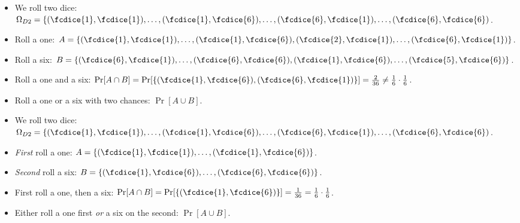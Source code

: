 \documentclass{beamer}
\begin{document}
\begin{frame}
  \begin{example}
    \begin{itemize}
      \item We roll two dice: \(\Omega_{D2} = \{(\fcdice{1},\fcdice{1}), 
          \ldots, (\fcdice{1}, \fcdice{6}), \ldots, (\fcdice{6}, \fcdice{1}), 
          \ldots, (\fcdice{6}, \fcdice{6})\).

        \pause{}

      \item Roll a one: \(A = \{(\fcdice{1}, \fcdice{1}), \ldots, (\fcdice{1}, 
          \fcdice{6}), (\fcdice{2}, \fcdice{1}), \ldots, (\fcdice{6}, 
          \fcdice{1})\}\).

      \item Roll a six: \(B = \{(\fcdice{6}, \fcdice{1}), \ldots, (\fcdice{6}, 
          \fcdice{6}), (\fcdice{1}, \fcdice{6}), \ldots, (\fcdice{5}, 
          \fcdice{6})\}\).

        \pause{}

      \item Roll a one and a six: \(\Pr[A\cap B] = \Pr[\{(\fcdice{1}, 
          \fcdice{6}), (\fcdice{6}, \fcdice{1})\}] = \frac{2}{36} \neq 
          \frac{1}{6}\cdot \frac{1}{6}\).

      \item Roll a one or a six with two chances: \(\Pr[A\cup B]\).

    \end{itemize}
  \end{example}
\end{frame}

\begin{frame}
  \begin{example}
    \begin{itemize}
      \item We roll two dice: \(\Omega_{D2} = \{(\fcdice{1},\fcdice{1}), 
          \ldots, (\fcdice{1}, \fcdice{6}), \ldots, (\fcdice{6}, \fcdice{1}), 
          \ldots, (\fcdice{6}, \fcdice{6})\).

        \pause{}

      \item \emph{First} roll a one: \(A = \{(\fcdice{1}, \fcdice{1}), \ldots, 
          (\fcdice{1}, \fcdice{6})\}\).

      \item \emph{Second} roll a six: \(B = \{(\fcdice{1}, \fcdice{6}), \ldots, 
          (\fcdice{6}, \fcdice{6})\}\).

        \pause{}

      \item First roll a one, then a six: \(\Pr[A\cap B] = \Pr[\{(\fcdice{1}, 
          \fcdice{6})\}] = \frac{1}{36} = \frac{1}{6}\cdot \frac{1}{6}\).

      \item Either roll a one first \emph{or} a six on the second: \(\Pr[A\cup 
          B]\).

    \end{itemize}
  \end{example}
\end{frame}
\end{document}

